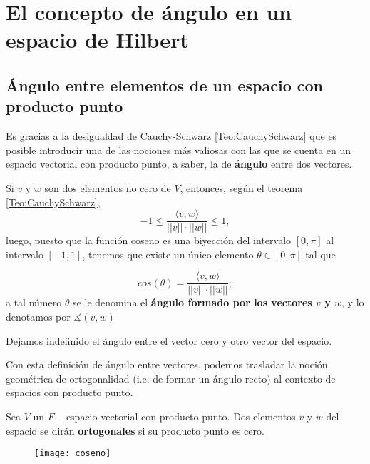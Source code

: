 \section{El concepto de ángulo en un espacio de Hilbert}

\subsection{Ángulo entre elementos de un espacio con producto punto}
\label{angulo entre elementos de un espacio con producto punto}

Es gracias a la desigualdad de Cauchy-Schwarz
\eqref{Teo:CauchySchwarz}
que es posible introducir una de las nociones
más valiosas con las que se cuenta en un espacio
vectorial con producto punto, a saber, la de \textbf{ángulo} entre dos
vectores.

Si $v$ y $w$ son dos elementos no cero de $V$, entonces,
según el teorema \ref{Teo:CauchySchwarz},
\[
-1 \leq \frac{\langle v, w \rangle}{||v|| \cdot ||w||} \leq 1,
\]
luego, puesto que la función coseno es una biyección
del intervalo $[0, \pi]$ al intervalo $[-1,1]$,
tenemos que existe un único elemento 
$\theta \in [0, \pi]$ tal que

\[
cos(\theta)= \frac{\langle v, w \rangle}{||v|| \cdot ||w||};
\]
a tal número $\theta$ se le denomina el 
\textbf{ángulo formado por los vectores $v$ y $w$},
y lo denotamos por $\measuredangle (v, w)$

Dejamos indefinido el ángulo entre el vector cero y otro vector
del espacio.

Con esta definición de ángulo entre vectores, podemos 
trasladar la noción geométrica de ortogonalidad (i.e. de formar
un ángulo recto) al contexto de espacios con producto punto.
\begin{defi}
\label{def: ortogonalidad}
Sea $V$ un $F-$espacio vectorial con producto punto.
Dos elementos $v$ y $w$ del espacio se dirán
\textbf{ortogonales} si su producto punto es cero.
\end{defi}

\begin{figure}[H]
	\centering
	\texttt{[image: coseno]} 
\end{figure}	


